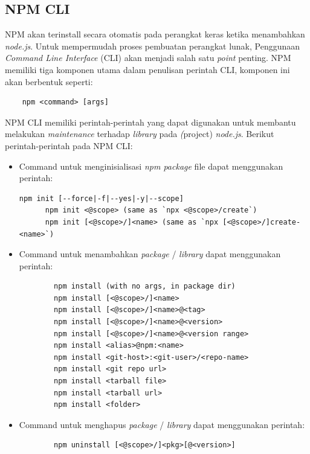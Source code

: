 \subsection{NPM CLI}
NPM akan terinstall secara otomatis pada perangkat keras ketika menambahkan \textit{node.js}. Untuk mempermudah proses pembuatan perangkat lunak, Penggunaan \textit{Command Line Interface} (CLI) akan menjadi salah satu \textit{point} penting. NPM memiliki tiga komponen utama dalam penulisan perintah CLI, komponen ini akan berbentuk seperti:
\begin{verbatim}
    npm <command> [args]
\end{verbatim}
NPM CLI memiliki perintah-perintah yang dapat digunakan untuk membantu melakukan \textit{maintenance} terhadap \textit{library} pada \textit(project) \textit{node.js}. Berikut perintah-perintah pada NPM CLI:

\begin{itemize}
    \item Command untuk menginisialisasi \textit{npm package} file dapat menggunakan perintah:
    \begin{lstlisting}[style=htmlcssjs]
      npm init [--force|-f|--yes|-y|--scope]
      npm init <@scope> (same as `npx <@scope>/create`)
      npm init [<@scope>/]<name> (same as `npx [<@scope>/]create-<name>`)
    \end{lstlisting}
    \item Command untuk menambahkan \textit{package} / \textit{library} dapat menggunakan perintah:
    \begin{lstlisting}
        npm install (with no args, in package dir)
        npm install [<@scope>/]<name>
        npm install [<@scope>/]<name>@<tag>
        npm install [<@scope>/]<name>@<version>
        npm install [<@scope>/]<name>@<version range>
        npm install <alias>@npm:<name>
        npm install <git-host>:<git-user>/<repo-name>
        npm install <git repo url>
        npm install <tarball file>
        npm install <tarball url>
        npm install <folder>
    \end{lstlisting}
    \item Command untuk menghapus \textit{package} / \textit{library} dapat menggunakan perintah:
    \begin{lstlisting}
        npm uninstall [<@scope>/]<pkg>[@<version>]
        
    \end{lstlisting}
    
\end{itemize}


